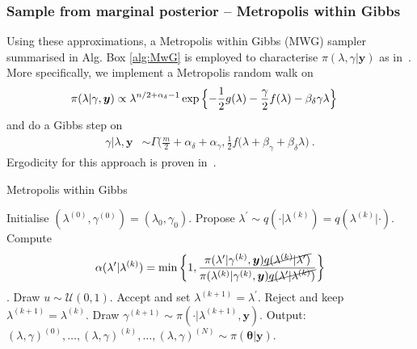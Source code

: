 \subsubsection{Sample from marginal posterior -- Metropolis within Gibbs}
\label{subsec:MWG}
Using these approximations, a Metropolis within Gibbs (MWG) sampler summarised in Alg. Box \ref{alg:MwG} is employed to characterise $\pi(\lambda,\gamma|\bm{y})$ as in~\cite{fox2016fast}.
More specifically, we implement a Metropolis random walk on
\begin{align}
	\label{eq:margApplCondGam}
	\pi(\lambda | \gamma, \bm{y}) &\propto \lambda^{n/2 +\alpha_{\delta}-1} \exp{\Bigl\{ - \frac{1}{2} g ( \lambda) - \frac{\gamma}{2} f ( \lambda) - \beta_\delta \gamma \lambda \Bigr\}}
\end{align} 
and do a Gibbs step on
\begin{align}
	\gamma |  \lambda, \bm{y} &\sim \Gamma \bigg( \frac{m}{2} + \alpha_\delta + \alpha_\gamma, \frac{1}{2} f (\lambda + \beta_\gamma + \beta_\delta \lambda \bigg)\label{eq:GibbsStep} \ .
\end{align} 
Ergodicity for this approach is proven in~\cite{roberts2006harris}.

\begin{algorithm}[!ht]
	\caption{Metropolis within Gibbs}
	\begin{algorithmic}[1]
		\STATE Initialise \( ( \lambda^{(0)} , \gamma^{(0)}  )= ( \lambda_{0} , \gamma_{0}  )  \).
		\STATE Propose \( \lambda^{\prime} \sim q(\cdot   | \lambda^{(k)}) = q(\lambda^{(k)} |\cdot  ) \).
		\STATE Compute
		\[ \alpha( \lambda^{\prime} | \lambda^{(k)}) = \min \left\{ 1, \frac{\pi(\lambda^{\prime}  | \gamma^{(k)}, \bm{y}) \cancel{q(\lambda^{(k)} | \lambda^{\prime} ) } }{\pi(\lambda^{(k)} | \gamma^{(k)}, \bm{y}) \cancel{q(\lambda^{\prime} | \lambda^{(k)})} } \right\} \].
		\STATE Draw $u \sim \mathcal{U}(0,1)$.
		\STATE Accept and set \( \lambda^{(k+1)} = \lambda^{\prime} \).
		\ELSE  
		\STATE Reject and keep \(\lambda^{(k+1)} = \lambda^{(k)} \).
		\ENDIF
		\STATE Draw \(\gamma^{(k+1)} \sim  \pi( \cdot | \lambda^{(k+1)} , \bm{y} )\).
		\ENDFOR
		\STATE Output: $ (\lambda,\gamma)^{(0)}, \dots,  (\lambda,\gamma)^{(k)} , \dots,   (\lambda,\gamma)^{(N)} \sim \pi(\bm{\theta}| \bm{y}) $.
	\end{algorithmic}
	\label{alg:MwG}
\end{algorithm}


